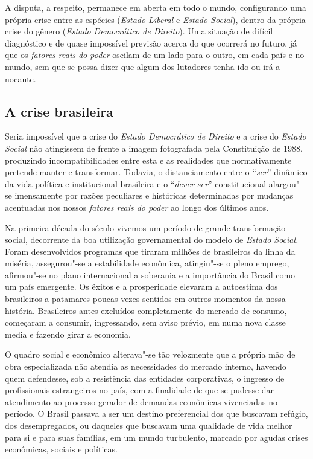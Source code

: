 A disputa, a respeito, permanece em aberta em todo o mundo, configurando
uma própria crise entre as espécies (\emph{Estado Liberal} e
\emph{Estado Social}), dentro da própria crise do gênero (\emph{Estado
Democrático de Direito}). Uma situação de difícil diagnóstico e de quase
impossível previsão acerca do que ocorrerá no futuro, já que os
\emph{fatores reais do poder} oscilam de um lado para o outro\emph{,} em
cada país e no mundo, sem que se possa dizer que algum dos lutadores
tenha ido ou irá a nocaute.

\subsection{A crise brasileira}

Seria impossível que a crise do \emph{Estado Democrático de Direito} e a
crise do \emph{Estado Social} não atingissem de frente a imagem
fotografada pela Constituição de 1988, produzindo incompatibilidades
entre esta e as realidades que normativamente pretende manter e
transformar. Todavia, o distanciamento entre o ``\emph{ser}'' dinâmico
da vida política e institucional brasileira e o ``\emph{dever ser}''
constitucional alargou"-se imensamente por razões peculiares e históricas
determinadas por mudanças acentuadas nos nossos \emph{fatores reais do
poder} ao longo dos últimos anos.

Na primeira década do século  vivemos um período de grande
transformação social, decorrente da boa utilização governamental do
modelo de \emph{Estado Social.} Foram desenvolvidos programas que
tiraram milhões de brasileiros da linha da miséria, assegurou"-se a
estabilidade econômica, atingiu"-se o pleno emprego, afirmou"-se no plano
internacional a soberania e a importância do Brasil como um país
emergente. Os êxitos e a prosperidade elevaram a autoestima dos
brasileiros a patamares poucas vezes sentidos em outros momentos da
nossa história. Brasileiros antes excluídos completamente do mercado de
consumo, começaram a consumir, ingressando, sem aviso prévio, em numa
nova classe media e fazendo girar a economia.

O quadro social e econômico alterava"-se tão velozmente que a própria mão
de obra especializada não atendia as necessidades do mercado interno,
havendo quem defendesse, sob a resistência das entidades corporativas, o
ingresso de profissionais estrangeiros no país, com a finalidade de que
se pudesse dar atendimento ao processo gerador de demandas econômicas
vivenciadas no período. O Brasil passava a ser um destino preferencial
dos que buscavam refúgio, dos desempregados, ou daqueles que buscavam
uma qualidade de vida melhor para si e para suas famílias, em um mundo
turbulento, marcado por agudas crises econômicas, sociais e políticas.

